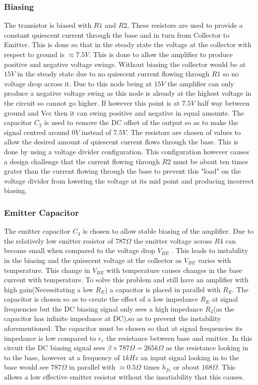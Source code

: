 \documentclass[10pt,a4paper]{article}
\begin{document}
\subsubsection{Biasing}
The transistor is biased with $R1$ and $R2$, These resistors are used to provide a constant quiescent current through the base and in turn from Collector to Emitter. This is done so that in the steady state the voltage at the collector with respect to ground is $\approx 7.5V$. This is done to allow the amplifier to produce positive and negative voltage swings. Without biasing the collector would be at $15V$ in the steady state due to no quiescent current flowing through $R1$ so no voltage drop across it. Due to this node being at $15V$ the amplifier can only produce a negative voltage swing as this node is already at the highest voltage in the circuit so cannot go higher. If however this point is at $7.5V$ half way between ground and Vcc then it can swing positive and negative in equal amounts. The capacitor $C_2$ is used to remove the DC offset of the output so as to make the signal centred around $0V$ instead of $7.5V$.\newline
      The resistors are chosen of values to allow the desired amount of quiescent  current flows through the base. This is done by using a voltage divider configuration. This configuration however causes a design challenge that the current flowing through $R2$ must be about ten times grater than the current flowing through the base to prevent this "load" on the voltage divider from lowering the voltage at its mid point and producing incorrect biasing.    
\subsubsection{Emitter Capacitor}
The emitter capacitor $C_3$ is chosen to allow stable biasing of the amplifier. Due to the relatively low emitter resistor of $787\Omega$ the emitter voltage across $R4$ can become small when compared to the voltage drop $V_{BE}$ \cite{ArtElectronics}. This leads to instability in the biasing and the quiescent voltage at the collector as $V_{BE}$ varies with temperature. This change in $V_{BE}$ with temperature causes changes in the base current with temperature. To solve this problem and still have an amplifier with high gain(Necessitating a low $R_E$) a capacitor is placed in parallel with $R_E$. The capacitor is chosen so as to create the effect of a low impedance $R_E$ at signal frequencies but the DC biasing signal only sees a high impedance $R_4$(as the capacitor has infinite impedance at DC),so as to prevent the instability aforementioned. The capacitor must be chosen so that at signal frequencies its impedance is low compared to $r_e$ the resistance between base and emitter\cite{ArtElectronics}. In this circuit the DC biasing signal sees $\beta \times 787\Omega = 265k\Omega$ as the resistance looking in to the base, however at a frequency of $1kHz$ an input signal looking in to the base would see $787\Omega$ in parallel with $\approx 0.5\Omega$ times $h_{fe}$ or about $168\Omega$. This allows a low effective emitter resistor without the insatiability that this causes.  
\end{document}
